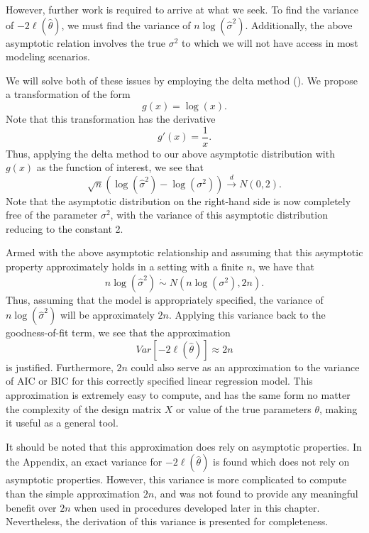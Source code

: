 \documentclass[12pt]{article} %
\theoremstyle{definition}
\begin{document}
		However, further work is required to arrive at what we seek. To find the variance of $-2 \ell (\hat{\theta}  )$, we must find the variance of $n \log(\hat{\sigma}^2)$.
		Additionally, the above asymptotic relation involves the true $\sigma^2$ to which we will not have access in most modeling scenarios.

		We will solve both of these issues by employing the delta method (\cite{Rao}). We propose a transformation of the form
		\begin{equation*}
			g(x) = \log(x) .
		\end{equation*}
		Note that this transformation has the derivative
		\begin{equation*}
			g'(x) = \frac{1}{x} .
		\end{equation*}
		Thus, applying the delta method to our above asymptotic distribution with $g(x)$ as the function of interest, we see that
		\begin{equation*}
			\sqrt{n} ( \log (\hat{\sigma}^2) - \log(\sigma^2)) \xrightarrow[]{d} N(0, 2) .
		\end{equation*}
		Note that the asymptotic distribution on the right-hand side is now completely free of the parameter $\sigma^2$, with the variance of this asymptotic distribution reducing
		to the constant 2.

		Armed with the above asymptotic relationship and assuming that this asymptotic property approximately holds in a setting with a finite $n$, we have that
		\begin{equation*}
			n\log(\hat{\sigma}^2) \; \dot\sim \; N \left( n\log(\sigma^2), 2n \right) .
		\end{equation*}
		Thus, assuming that the model is appropriately specified, the variance of $n\log(\hat{\sigma}^2)$ will be approximately $2n$. Applying this variance back to the goodness-of-fit term,
		we see that the approximation
		\begin{equation*}
			Var \left[ -2 \ell (\hat{\theta}  ) \right] \approx 2n
		\end{equation*}
		is justified. Furthermore, $2n$ could also serve as an approximation to the variance of AIC or BIC for this correctly specified linear regression model. This approximation
		is extremely easy to compute, and has the same form no matter the complexity of the design matrix $X$ or value of the true parameters $\theta$, making it useful as a
		general tool.

		It should be noted that this approximation does rely on asymptotic properties. In the Appendix, an exact variance for $-2 \ell (\hat{\theta})$ is found which does
		not rely on asymptotic properties. However, this variance is more complicated to compute than the simple approximation $2n$, and was not found to provide any meaningful
		benefit over $2n$ when used in procedures developed later in this chapter. Nevertheless, the derivation of this variance is presented for completeness.
\end{document}
